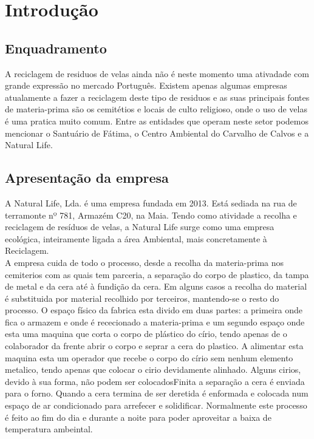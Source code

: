 \chapter{Introdução}
\label{cap:1}

\section{Enquadramento}
A reciclagem de residuos de velas ainda não é neste momento uma ativadade com grande expressão no mercado Português. Existem apenas algumas empresas atualamente a fazer a reciclagem deste tipo de residuos e as suas principais fontes de materia-prima são os cemitétios e locais de culto religioso, onde o uso de velas é uma pratica muito comum. Entre as entidades que operam neste setor podemos mencionar o Santuário de Fátima\cite{Destak2010}, o Centro Ambiental do Carvalho de Calvos\cite{SecundinoCunha2016} e a Natural Life\cite{NaturalLife}.

\section{Apresentação da empresa}
A Natural Life, Lda. é uma empresa fundada em 2013. Está sediada na rua de terramonte nº 781, Armazém C20, na Maia. Tendo como atividade a recolha e reciclagem de resíduos de velas, a Natural Life surge como uma empresa ecológica, inteiramente ligada a área Ambiental, mais concretamente à Reciclagem.\cite{NaturalLife}\\
A empresa cuida de todo o processo, desde a recolha da materia-prima nos cemiterios com as quais tem parceria, a separação do corpo de plastico, da tampa de metal e da cera até à fundição da cera. Em alguns casos a recolha do material é substituida por material recolhido por terceiros, mantendo-se o resto do processo.
O espaço físico da fabrica esta divido em duas partes: a primeira onde fica o armazem e onde é rececionado a materia-prima e um segundo espaço onde esta uma maquina que corta o corpo de plástico do círio, tendo apenas de o colaborador da frente abrir o corpo e seprar a cera do plastico. A alimentar esta maquina esta um operador que recebe o corpo do círio sem nenhum elemento metalico, tendo apenas que colocar o cirio devidamente alinhado. Alguns cirios, devido à sua forma, não podem ser colocadosFinita a separação a cera é enviada para o forno. Quando a cera termina de ser deretida é enformada e colocada num espaço de ar condicionado para arrefecer e solidificar. Normalmente este processo é feito ao fim do dia e durante a noite para poder aproveitar a baixa de temperatura ambeintal.

